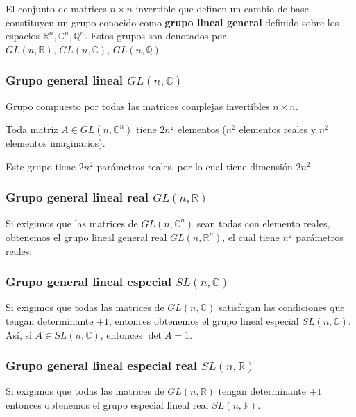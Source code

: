\begin{defi}
	El conjunto de matrices $n\times n$ invertible que definen un cambio de base constituyen un grupo conocido como \textbf{grupo lineal general} definido sobre los espacios $\mathbb{R}^n,\mathbb{C}^n,\mathbb{Q}^n$. Estos grupos son denotados por $GL(n,\mathbb{R}),\, GL(n,\mathbb{C}),\, GL(n,\mathbb{Q})$.
\end{defi}

\subsubsection{Grupo general lineal $GL(n,\mathbb{C})$}
Grupo compuesto por todas las matrices complejas invertibles $n\times n$.

 Toda matriz $A\in GL(n,\mathbb{C}^n)$ tiene $2n^2$ elementos ($n^2$ elementos reales y $n^2$ elementos imaginarios).
 
 Este grupo tiene $2n^2$ parámetros reales, por lo cual tiene dimensión $2n^2$.
 
 \subsubsection{Grupo general lineal real $GL(n,\mathbb{R})$}
 Si exigimos que las matrices de $GL(n,\mathbb{C}^n)$ sean todas con elemento reales, obtenemos el grupo lineal general real $GL(n,\mathbb{R}^n)$, el cual tiene $n^2$ parámetros reales.
 
 \subsubsection{Grupo general lineal especial $SL(n,\mathbb{C})$}
 Si exigimos que todas las matrices de $GL(n,\mathbb{C})$ satisfagan las condiciones que tengan determinante $+1$, entonces obtenemos el grupo lineal especial $SL(n,\mathbb{C})$. Así, si $A\in SL(n,\mathbb{C})$, entonces $\det A=1$.
 
  \subsubsection{Grupo general lineal especial real $SL(n,\mathbb{R})$}
Si exigimos que todas las matrices de $GL(n,\mathbb{R})$ tengan determinante $+1$ entonces obtenemos el grupo especial lineal real $SL(n,\mathbb{R})$.









































